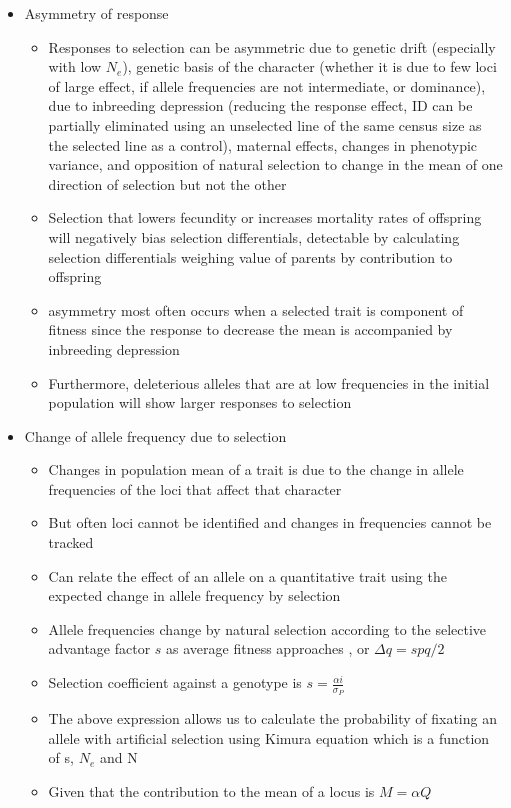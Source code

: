 \documentclass[12pt]{amsart}
\begin{document}
\begin{itemize}
\item Asymmetry of response
\begin{itemize}
\item Responses to selection can be asymmetric due to genetic drift (especially with low $N_e$), genetic basis of the character (whether it is due to few loci of large effect, if allele frequencies are not intermediate, or dominance), due to inbreeding depression (reducing the response effect, ID can be partially eliminated using an unselected line of the same census size as the selected line as a control), maternal effects, changes in phenotypic variance, and opposition of natural selection to change in the mean of one direction of selection but not the other
\item Selection that lowers fecundity or increases mortality rates of offspring will negatively bias selection differentials, detectable by calculating selection differentials weighing value of parents by contribution to offspring
\item asymmetry most often occurs when a selected trait is component of fitness since the response to decrease the mean is accompanied by inbreeding depression 
\item Furthermore, deleterious alleles that are at low frequencies in the initial population will show larger responses to selection
\end{itemize}
\item Change of allele frequency due to selection
\begin{itemize}
\item Changes in population mean of a trait is due to the change in allele frequencies of the loci that affect that character
\item But often loci cannot be identified and changes in frequencies cannot be tracked
\item Can relate the effect of an allele on a quantitative trait using the expected change in allele frequency by selection
\item Allele frequencies change by natural selection according to the selective advantage factor $s$ as average fitness approaches , or $\Delta q = spq/2$
\item Selection coefficient against a genotype is $s = \frac{\alpha i}{\sigma_P}$ 
\item The above expression allows us to calculate the probability of fixating an allele with artificial selection using Kimura equation which is a function of s, $N_e$ and N
\item Given that the contribution to the mean of a locus is $M = \alpha Q$ 

\end{itemize}
\end{itemize}
\end{document}
